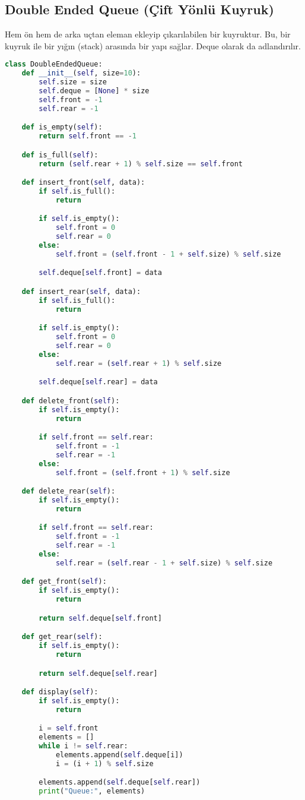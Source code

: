 \newpage

\subsection{Double Ended Queue (Çift Yönlü Kuyruk)}

Hem ön hem de arka uçtan eleman ekleyip çıkarılabilen bir kuyruktur. Bu, bir kuyruk ile bir yığın (stack) arasında bir yapı sağlar. Deque olarak da adlandırılır.

\begin{lstlisting}[language=Python]
class DoubleEndedQueue:
    def __init__(self, size=10):
        self.size = size
        self.deque = [None] * size
        self.front = -1
        self.rear = -1

    def is_empty(self):
        return self.front == -1

    def is_full(self):
        return (self.rear + 1) % self.size == self.front

    def insert_front(self, data):
        if self.is_full():
            return

        if self.is_empty():
            self.front = 0
            self.rear = 0
        else:
            self.front = (self.front - 1 + self.size) % self.size

        self.deque[self.front] = data

    def insert_rear(self, data):
        if self.is_full():
            return

        if self.is_empty():
            self.front = 0
            self.rear = 0
        else:
            self.rear = (self.rear + 1) % self.size

        self.deque[self.rear] = data

    def delete_front(self):
        if self.is_empty():
            return

        if self.front == self.rear:
            self.front = -1
            self.rear = -1
        else:
            self.front = (self.front + 1) % self.size

    def delete_rear(self):
        if self.is_empty():
            return

        if self.front == self.rear:
            self.front = -1
            self.rear = -1
        else:
            self.rear = (self.rear - 1 + self.size) % self.size

    def get_front(self):
        if self.is_empty():
            return

        return self.deque[self.front]

    def get_rear(self):
        if self.is_empty():
            return

        return self.deque[self.rear]

    def display(self):
        if self.is_empty():
            return

        i = self.front
        elements = []
        while i != self.rear:
            elements.append(self.deque[i])
            i = (i + 1) % self.size

        elements.append(self.deque[self.rear])
        print("Queue:", elements)
\end{lstlisting}

